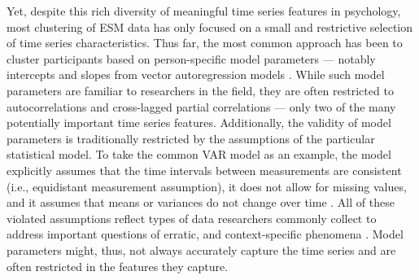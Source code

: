 \documentclass[man, 12pt, a4paper, mask, floatsintext]{apa7}
\theoremstyle{break}
\theoremstyle{plain}
\begin{document}
Yet, despite this rich diversity of meaningful time series features in psychology, most clustering of ESM data has only focused on a small and restrictive selection of time series characteristics. Thus far, the most common approach has been to cluster participants based on person-specific model parameters --- notably intercepts and slopes from vector autoregression models \citep[VAR; e.g.,][]{ariens2020, bulteel2016, stefanovic2022}. While such model parameters are familiar to researchers in the field, they are often restricted to autocorrelations and cross-lagged partial correlations \citep[e.g.,][]{bringmann2018c} --- only two of the many potentially important time series features. Additionally, the validity of model parameters is traditionally restricted by the assumptions of the particular statistical model. To take the common VAR model as an example, the model explicitly assumes that the time intervals between measurements are consistent (i.e., equidistant measurement assumption), it does not allow for missing values, and it assumes that means or variances do not change over time \citep[i.e., stationarity assumption;][]{lutkepohl2005}. All of these violated assumptions reflect types of data researchers commonly collect to address important questions of erratic, and context-specific phenomena \citep[][]{myin-germeys2018, hamaker2017, kivela2022, helmich2020a}. Model parameters might, thus, not always accurately capture the time series and are often restricted in the features they capture.


\end{document}
